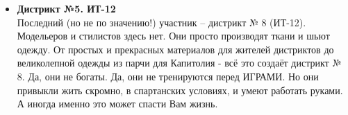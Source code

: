 \begin{itemize}
\item \textbf{Дистрикт №5. ИТ-12}\\
Последний (но не по значению!) участник – дистрикт № 8 (ИТ-12). Модельеров и стилистов здесь нет. Они просто производят ткани и шьют одежду. От простых и прекрасных материалов для жителей дистриктов до великолепной одежды из парчи для Капитолия - всё это создаёт дистрикт № 8. Да, они не богаты. Да, они не тренируются перед ИГРАМИ. Но они привыкли жить скромно, в спартанских условиях, и умеют работать руками. А иногда именно это может спасти Вам жизнь.
\end{itemize}